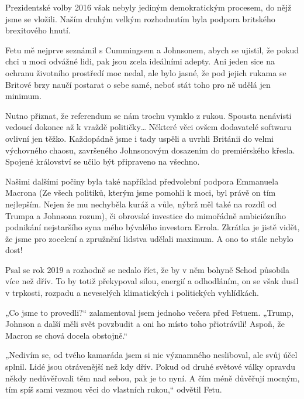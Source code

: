 Prezidentské volby 2016 však nebyly jediným demokratickým procesem, do nějž jsme se vložili. Naším druhým velkým rozhodnutím byla podpora britského brexitového hnutí.

Fetu mě nejprve seznámil s Cummingsem a Johnsonem, abych se ujistil, že pokud chci u moci odvážné lidi, pak jsou zcela ideálními adepty. Ani jeden sice na ochranu životního prostředí moc nedal, ale bylo jasné, že pod jejich rukama se Britové brzy naučí postarat o sebe samé, neboť stát toho pro ně udělá jen minimum.  

Nutno přiznat, že referendum se nám trochu vymklo z rukou. Spousta nenávisti vedoucí dokonce až k vraždě političky… Některé věci ovšem dodavatelé softwaru ovlivní jen těžko.
Každopádně jsme i tady uspěli a uvrhli Británii do velmi výchovného chaosu, završeného Johnsonovým dosazením do premiérského křesla. Spojené království se učilo být připraveno na všechno.

Našimi dalšími počiny byla také například předvolební podpora Emmanuela Macrona (Ze všech politiků, kterým jsme pomohli k moci, byl právě on tím nejlepším. Nejen že mu nechyběla kuráž a vůle, nýbrž měl také na rozdíl od Trumpa a Johnsona rozum), či obrovské investice do mimořádně ambiciózního podnikání nejstaršího syna mého bývalého investora Errola.
Zkrátka je jistě vidět, že jsme pro zocelení a zpružnění lidstva udělali maximum. A ono to stále nebylo dost! 

Psal se rok 2019 a rozhodně se nedalo říct, že by v něm bohyně Schod působila více než dřív. To by totiž překypoval silou, energií a odhodláním, on se však dusil v trpkosti, rozpadu a neveselých klimatických i politických vyhlídkách. 

„Co jsme to provedli?“ zalamentoval jsem jednoho večera před Fetuem. „Trump, Johnson a další měli svět povzbudit a oni ho místo toho přiotrávili! Aspoň, že Macron se chová docela obstojně.“

„Nedivím se, od tvého kamaráda jsem si nic významného nesliboval, ale svůj účel splnil. Lidé jsou otrávenější než kdy dřív. Pokud od druhé světové války opravdu někdy nedůvěřovali těm nad sebou, pak je to nyní. A čím méně důvěřují mocným, tím spíš sami vezmou věci do vlastních rukou,“ odvětil Fetu.
